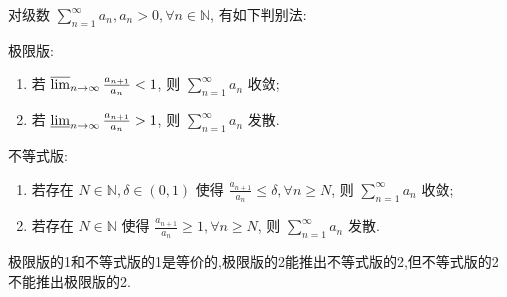 \documentclass[../../main.tex]{subfiles}%
\begin{document}
\begin{theorem}[比值判别法]\label{theorem:级数-比值判别法}
对级数 \( \sum_{n=1}^\infty a_n, a_n > 0, \forall n \in \mathbb{N} \), 有如下判别法:

极限版:
\begin{enumerate}
\item 若 \( \varlimsup_{n \to \infty} \frac{a_{n + 1}}{a_n} < 1 \), 则 \( \sum_{n=1}^\infty a_n \) 收敛;

\item 若 \( \varliminf_{n \to \infty} \frac{a_{n + 1}}{a_n} > 1 \), 则 \( \sum_{n=1}^\infty a_n \) 发散.
\end{enumerate}

不等式版:
\begin{enumerate}
\item 若存在 \( N \in \mathbb{N}, \delta \in (0, 1) \) 使得 \( \frac{a_{n + 1}}{a_n} \leqslant \delta, \forall n \geqslant N \), 则 \( \sum_{n=1}^\infty a_n \) 收敛;

\item 若存在 \( N \in \mathbb{N} \) 使得 \( \frac{a_{n + 1}}{a_n} \geqslant 1, \forall n \geqslant N \), 则 \( \sum_{n=1}^\infty a_n \) 发散.
\end{enumerate}
\end{theorem}
\begin{remark}
极限版的1和不等式版的1是等价的,极限版的2能推出不等式版的2,但不等式版的2不能推出极限版的2.
\end{remark}
\end{document}
